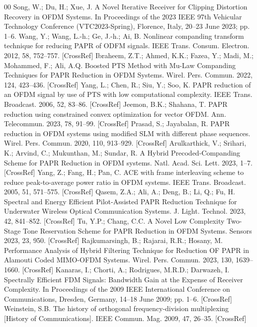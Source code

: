 \documentclass[conference]{IEEEtran}
\begin{document}
\begin{thebibliography}{00}
 Song, W.; Du, H.; Xue, J. A Novel Iterative Receiver for Clipping Distortion Recovery in OFDM Systems. In Proceedings of the 2023 IEEE 97th Vehicular Technology Conference (VTC2023-Spring), Florence, Italy, 20–23 June 2023; pp. 1–6.
 Wang, Y.; Wang, L.-h.; Ge, J.-h.; Ai, B. Nonlinear companding transform technique for reducing PAPR of ODFM signals. IEEE Trans. Consum. Electron. 2012, 58, 752–757. [CrossRef]
 Ibraheem, Z.T.; Ahmed, K.K.; Fazea, Y.; Madi, M.; Mohammed, F.; Ali, A.Q. Boosted PTS Method with Mu-Law Companding Techniques for PAPR Reduction in OFDM Systems. Wirel. Pers. Commun. 2022, 124, 423–436. [CrossRef]
 Yang, L.; Chen, R.; Siu, Y.; Soo, K. PAPR reduction of an OFDM signal by use of PTS with low computational complexity. IEEE Trans. Broadcast. 2006, 52, 83–86. [CrossRef]
 Jeemon, B.K.; Shahana, T. PAPR reduction using constrained convex optimization for vector OFDM. Ann. Telecommun. 2023, 78, 91–99. [CrossRef]
 Prasad, S.; Jayabalan, R. PAPR reduction in OFDM systems using modified SLM with different phase sequences. Wirel. Pers. Commun. 2020, 110, 913–929. [CrossRef]
 Arulkarthick, V.; Srihari, K.; Arvind, C.; Mukunthan, M.; Sundar, R. A Hybrid Precoded-Companding Scheme for PAPR Reduction in OFDM systems. Natl. Acad. Sci. Lett. 2023, 1–7. [CrossRef]
 Yang, Z.; Fang, H.; Pan, C. ACE with frame interleaving scheme to reduce peak-to-average power ratio in OFDM systems. IEEE Trans. Broadcast. 2005, 51, 571–575. [CrossRef]
 Qasem, Z.A.; Ali, A.; Deng, B.; Li, Q.; Fu, H. Spectral and Energy Efficient Pilot-Assisted PAPR Reduction Technique for Underwater Wireless Optical Communication Systems. J. Light. Technol. 2023, 42, 841–852. [CrossRef]
 Tu, Y.P.; Chang, C.C. A Novel Low Complexity Two-Stage Tone Reservation Scheme for PAPR Reduction in OFDM Systems. Sensors 2023, 23, 950. [CrossRef]
 Rajkumarsingh, B.; Rajarai, R.R.; Hosany, M. Performance Analysis of Hybrid Filtering Technique for Reduction OF PAPR in Alamouti Coded MIMO-OFDM Systems. Wirel. Pers. Commun. 2023, 130, 1639–1660. [CrossRef]
 Kanaras, I.; Chorti, A.; Rodrigues, M.R.D.; Darwazeh, I. Spectrally Efficient FDM Signals: Bandwidth Gain at the Expense of Receiver Complexity. In Proceedings of the 2009 IEEE International Conference on Communications, Dresden, Germany, 14–18 June 2009; pp. 1–6. [CrossRef]
 Weinstein, S.B. The history of orthogonal frequency-division multiplexing [History of Communications]. IEEE Commun. Mag. 2009, 47, 26–35. [CrossRef]

\end{thebibliography}
\end{document}
